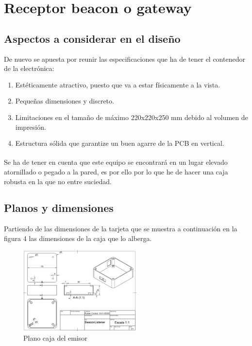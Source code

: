 \documentclass[paper=a4, fontsize=11pt,twoside]{scrartcl}
\begin{document}
\section{Receptor beacon o gateway}
    \subsection{Aspectos a considerar en el diseño}
        De nuevo se apuesta por reunir las especificaciones que ha de tener el contenedor de la electrónica:
        \begin{enumerate}
            \item Estéticamente atractivo, puesto que va a estar físicamente a la vista.
            \item Pequeñas dimensiones y discreto.
            \item Limitaciones en el tamaño de máximo 220x220x250 mm debido al volumen de impresión.
            \item Estructura sólida que garantize un buen agarre de la PCB en vertical.
        \end{enumerate}
        \paragraph{}
        Se ha de tener en cuenta que este equipo se encontrará en un lugar elevado atornillado o pegado a la pared, 
        es por ello por lo que he de hacer una caja robusta en la que no entre suciedad. 
    \subsection{Planos y dimensiones}
        \paragraph{}
        Partiendo de las dimensiones de la tarjeta que se muestra a continuación en la figura 4 las dimensiones de la caja que lo 
        alberga.
        \begin{center}
            \begin{figure}[h]
                \centering
                \includegraphics[width=0.55\textwidth]{../model_master.PNG}
                \caption{Plano caja del emisor}
                \label{fig:mesh1}
            \end{figure}
        \end{center}
\end{document}
